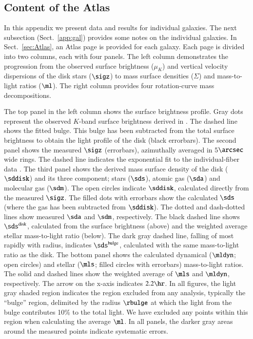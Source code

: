 \documentclass[traditabstract]{aa} %
\begin{document}
{\small
%
\subsection{Content of the Atlas}
In this appendix we present data and results for individual galaxies. The next subsection
(Sect.~\ref{app:gal}) provides some notes on the individual galaxies. In
Sect.~\ref{sec:Atlas}, an Atlas page is provided for each galaxy. Each
page is divided into two columns, each with four panels. The left column
demonstrates the progression from the observed surface brightness ($\mu_{K}$) and vertical
velocity dispersions of the disk stars ($\sigz$) to mass surface densities ($\Sigma$) and
mass-to-light ratios ($\ml$). The right column provides four rotation-curve mass 
decompositions.

The top panel in the left column shows the surface brightness profile. Gray dots represent 
the observed $K$-band surface brightness derived in . The
dashed line shows the fitted bulge. This bulge has been subtracted from the total surface 
brightness to obtain the light profile of the disk (black errorbars).
%
The second panel shows the measured $\sigz$ (errorbars), azimuthally averaged in 
5$\arcsec$ wide rings. The dashed line indicates the exponential fit to the 
individual-fiber data .
%
The third panel shows the derived mass surface density of the disk ($\sddisk$) and its
three component; stars ($\sds$), atomic gas ($\sda$) and molecular gas ($\sdm$). The open
circles indicate $\sddisk$, calculated directly from the measured $\sigz$. The filled dots
with errorbars show the calculated $\sds$ (where the gas has been subtracted from
$\sddisk$). The dotted and dash-dotted lines show measured $\sda$ and $\sdm$, 
respectively. The black dashed line shows $\sds^{\rm disk}$, calculated from the surface
brightness (above) and the weighted average stellar mass-to-light ratio (below).
The dark gray dashed line, falling of most rapidly with radius, indicates
$\sds^{\rm bulge}$, calculated with the same mass-to-light ratio as the disk.
%
The bottom panel shows the calculated dynamical ($\mldyn$; open circles) and stellar 
($\mls$; filled circles with errorbars) mass-to-light ratios. The solid and dashed lines 
show the weighted average of $\mls$ and $\mldyn$, respectively. The arrow on the x-axis 
indicates $2.2\hr$.
%
In all figures, the light gray shaded region indicates the region excluded from any 
analysis, typically the ``bulge'' region, delimited by the radius $\rbulge$ at which the
light from the bulge contributes 10\% to the total light. We have excluded any points
within this region when calculating the average $\ml$. In all panels, the darker gray
areas around the measured points indicate systematic errors.

}
\end{document}
